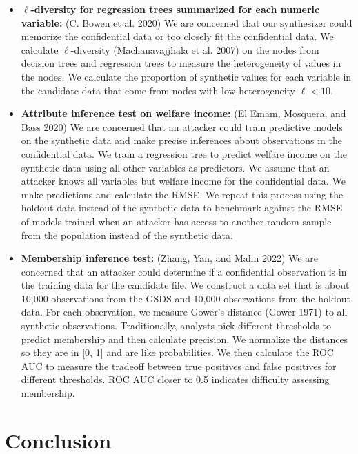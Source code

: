 \documentclass[
]{urban-formatting}
\begin{document}
\begin{itemize}
\item
  \textbf{\(\ell\)-diversity for regression trees summarized for each
  numeric variable:} (C. Bowen et al. 2020) We are concerned that our
  synthesizer could memorize the confidential data or too closely fit
  the confidential data. We calculate \(\ell\)-diversity
  (Machanavajjhala et al. 2007) on the nodes from decision trees and
  regression trees to measure the heterogeneity of values in the nodes.
  We calculate the proportion of synthetic values for each variable in
  the candidate data that come from nodes with low heterogeneity
  \(\ell < 10\).
\item
  \textbf{Attribute inference test on welfare income:} (El Emam,
  Mosquera, and Bass 2020) We are concerned that an attacker could train
  predictive models on the synthetic data and make precise inferences
  about observations in the confidential data. We train a regression
  tree to predict welfare income on the synthetic data using all other
  variables as predictors. We assume that an attacker knows all
  variables but welfare income for the confidential data. We make
  predictions and calculate the RMSE. We repeat this process using the
  holdout data instead of the synthetic data to benchmark against the
  RMSE of models trained when an attacker has access to another random
  sample from the population instead of the synthetic data.
\item
  \textbf{Membership inference test:} (Zhang, Yan, and Malin 2022) We
  are concerned that an attacker could determine if a confidential
  observation is in the training data for the candidate file. We
  construct a data set that is about 10,000 observations from the GSDS
  and 10,000 observations from the holdout data. For each observation,
  we measure Gower's distance (Gower 1971) to all synthetic
  observations. Traditionally, analysts pick different thresholds to
  predict membership and then calculate precision. We normalize the
  distances so they are in {[}0, 1{]} and are like probabilities. We
  then calculate the ROC AUC to measure the tradeoff between true
  positives and false positives for different thresholds. ROC AUC closer
  to 0.5 indicates difficulty assessing membership.
\end{itemize}

\section{Conclusion}
\end{document}
